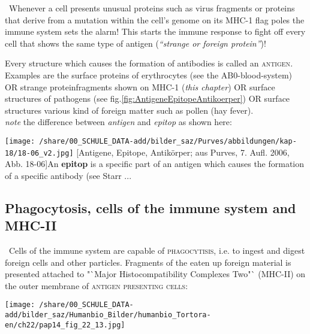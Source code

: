 \vspace{0.3cm}
\bgroup \centering \Pointinghand\, Whenever a cell presents unusual proteins such as virus fragments or proteins that derive from a mutation within the cell's genome on its MHC-1 flag poles the immune system sets the alarm! This starts the immune response to fight off every cell that shows the same type of antigen (\textit{"`strange or foreign protein"'})!
\egroup

\enlargethispage{1.4cm}
\vfill
	\hfill	\begin{mdframed}[style=exampledefault,leftmargin=-1cm, userdefinedwidth=16cm,frametitle={\hfill Antigene: "`antibody generating agent"'\hfill}\label{mat:BEISPIELMATERIAL}]
			Every structure which causes the formation of antibodies is called an \textsc{antigen}. Examples are the surface proteins of erythrocytes (see the \textsc{AB0}-blood-system) OR strange proteinfragments shown on MHC-1 (\textit{this chapter}) OR surface structures of pathogens (see fig.\ref{fig:AntigeneEpitopeAntikoerper}) OR surface structures various kind of foreign matter such as pollen (hay fever).\\
			\emph{note} the difference between  \emph{antigen} and \emph{epitop} as shown here:

	 \centering
		  \texttt{[image: /share/00\_SCHULE\_DATA-add/bilder\_saz/Purves/abbildungen/kap-18/18-06\_v2.jpg]}
		  [Antigene, Epitope, Antikörper; aus Purves, 7. Aufl. 2006, Abb. 18-06]{An \textbf{epitop} is a specific part of an antigen which causes the formation of a specific antibody (see   Starr ... }
		  \label{fig:AntigeneEpitopeAntikoerper}
		\end{mdframed}

\clearpage
\subsection{Phagocytosis, cells of the immune system and MHC-II}
\Pointinghand\, Cells of the immune system are capable of \textsc{phagocytisis}, i.e. to ingest and digest foreign cells and other particles. Fragments of the eaten up foreign material is presented attached to "`Major Histocompatibility Complexes Two"` (MHC-II) on the outer membrane of \textsc{antigen presenting cells}:

\vspace{1cm}
	\begin{minipage}{12cm}
	 \centering
		\texttt{[image: /share/00\_SCHULE\_DATA-add/bilder\_saz/Humanbio\_Bilder/humanbio\_Tortora-en/ch22/pap14\_fig\_22\_13.jpg]}
	\end{minipage}

